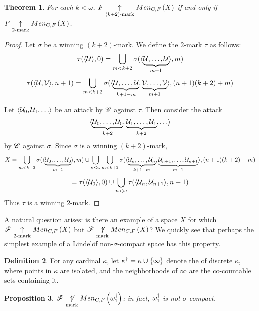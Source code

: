 \documentclass{amsart}
\newtheorem{theorem}{Theorem}[section]
\newtheorem{proposition}[theorem]{Proposition}
\theoremstyle{definition}
\newtheorem{definition}[theorem]{Definition}
\begin{document}
\begin{theorem}
  For each \(k<\omega\), \(F \underset{(k+2)\text{-mark}}{\uparrow} Men_{C,F}\left({X}\right)\)
  if and only if \(F \underset{2\text{-mark}}{\uparrow} Men_{C,F}\left({X}\right)\).
\end{theorem}

\begin{proof}
  Let \(\sigma\) be a winning \((k+2)\)-mark. We define the \(2\)-mark \(\tau\) as
  follows:
    \[
      \tau(\langle\mathcal{U}\rangle,0)
        =
      \bigcup_{m<k+2}
        \sigma(\langle\underbrace{\mathcal{U},\dots,\mathcal{U}}_{m+1}\rangle,m)
    \]
    \[
      \tau(\langle\mathcal{U},\mathcal{V}\rangle,n+1)
        =
      \bigcup_{m<k+2}
        \sigma(\langle
          \underbrace{\mathcal{U},\dots,\mathcal{U}}_{k+1-m},
          \underbrace{\mathcal{V},\dots,\mathcal{V}}_{m+1}
        \rangle,(n+1)(k+2)+m)
    \]

  Let \(\<\mc U_0,\mc U_1,\dots\>\) be an attack by \(\mathscr{C}\) against \(\tau\).
  Then consider the attack
    \[
      \<
        \underbrace{\mc U_0,\dots,\mc U_0}_{k+2},
        \underbrace{\mc U_1,\dots,\mc U_1}_{k+2},
        \dots
      \>
    \]
  by \(\mathscr{C}\) against \(\sigma\). Since \(\sigma\) is a winning \((k+2)\)-mark,
    \[
      X
        =
      \bigcup_{m<k+2}
        \sigma(\langle\underbrace{\mathcal{U}_0,\dots,\mathcal{U}_0}_{m+1}\rangle,m)
      \cup
      \bigcup_{n<\omega}
      \bigcup_{m<k+2}
        \sigma(\langle
          \underbrace{\mathcal{U}_n,\dots,\mathcal{U}_n}_{k+1-m},
          \underbrace{\mathcal{U}_{n+1},\dots,\mathcal{U}_{n+1}}_{m+1}
        \rangle,(n+1)(k+2)+m)
    \]
    \[
      =
      \tau(\langle\mathcal{U}_0\rangle,0)
      \cup
      \bigcup_{n<\omega}
      \tau(\langle\mathcal{U}_n,\mathcal{U}_{n+1}\rangle,n+1)
    \]
  Thus \(\tau\) is a winning \(2\)-mark.
\end{proof}

A natural question arises: is there an example of a space \(X\) for which
\(\mathscr{F}\underset{2\text{-mark}}{\uparrow}Men_{C,F}\left({X}\right)\) but \(\mathscr{F}\underset{\text{mark}}{\not\uparrow}Men_{C,F}\left({X}\right)\)? We quickly
see that perhaps the simplest example of a Lindel\"of non-\(\sigma\)-compact
space has this property.

\begin{definition}
  For any cardinal \(\kappa\), let \(\kappa^\dagger=\kappa\cup\{\infty\}\) denote
  the  of discrete \(\kappa\), where points in
  \(\kappa\) are isolated, and the neighborhoods of \(\infty\) are the co-countable
  sets containing it.
\end{definition}

\begin{proposition}
  \(\mathscr{F} \underset{\text{mark}}{\not\uparrow} Men_{C,F}\left({\omega_1^\dagger}\right)\); in fact,
  \(\omega_1^\dagger\) is not \(\sigma\)-compact.
\end{proposition}
\end{document}
